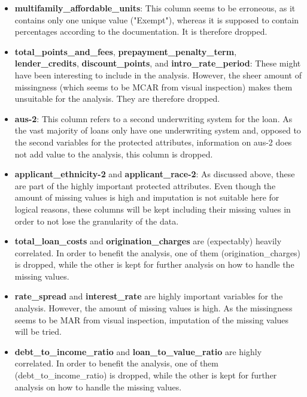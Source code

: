 \begin{itemize}
    \item \textbf{multifamily\_affordable\_units}: This column seems to be erroneous, as it contains only one unique value ("Exempt"), whereas it is supposed to contain percentages according to the documentation. It is therefore dropped.
    \item \textbf{total\_points\_and\_fees}, \textbf{prepayment\_penalty\_term}, \textbf{lender\_credits}, \textbf{discount\_points}, and \textbf{intro\_rate\_period}: These might have been interesting to include in the analysis. However, the sheer amount of missingness (which seems to be MCAR from visual inspection) makes them unsuitable for the analysis. They are therefore dropped.
    \item \textbf{aus-2}: This column refers to a second underwriting system for the loan. As the vast majority of loans only have one underwriting system and, opposed to the second variables for the protected attributes, information on aus-2 does not add value to the analysis, this column is dropped.
    \item \textbf{applicant\_ethnicity-2} and \textbf{applicant\_race-2}: As discussed above, these are part of the highly important protected attributes. Even though the amount of missing values is high and imputation is not suitable here for logical reasons, these columns will be kept including their missing values in order to not lose the granularity of the data.
    \item \textbf{total\_loan\_costs} and \textbf{origination\_charges} are (expectably) heavily correlated. In order to benefit the analysis, one of them (origination\_charges) is dropped, while the other is kept for further analysis on how to handle the missing values.
    \item \textbf{rate\_spread} and \textbf{interest\_rate} are highly important variables for the analysis. However, the amount of missing values is high. As the missingness seems to be MAR from visual inspection, imputation of the missing values will be tried.
    \item \textbf{debt\_to\_income\_ratio} and \textbf{loan\_to\_value\_ratio} are highly correlated. In order to benefit the analysis, one of them (debt\_to\_income\_ratio) is dropped, while the other is kept for further analysis on how to handle the missing values.
\end{itemize}


